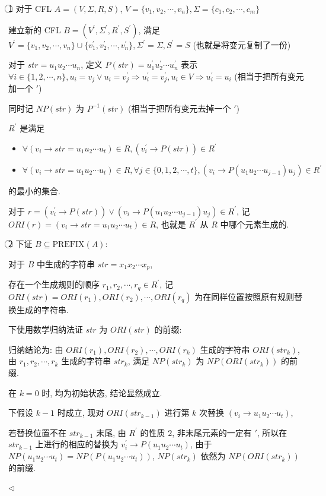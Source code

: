 \documentclass[11pt]{article}
\newenvironment{answer}[1][Answer]{\begin{trivlist}
		\item[\hskip \labelsep {\bfseries #1.}\hskip \labelsep]}{\hfill$\lhd$\end{trivlist}}
\begin{document}
	\begin{answer}
		\textcircled{1} 对于 CFL $A=(V,\Sigma,R,S)$, $V=\{v_1,v_2,\cdots,v_n\},\Sigma=\{c_1,c_2,\cdots,c_m\}$
		
		建立新的 CFL $B=(V^\prime,\Sigma^\prime,R^\prime,S^\prime)$, 满足 $V^\prime=\{v_1,v_2,\cdots,v_n\}\cup\{v_1^\prime,v_2^\prime,\cdots,v_n^\prime\},\Sigma^\prime=\Sigma,S^\prime=S$ (也就是将变元复制了一份)
		
		对于 $str=u_1u_2\cdots u_n$, 定义 $P(str)=u_1^\prime u_2^\prime\cdots u_n^\prime$ 表示 $\forall i\in\{1,2,\cdots,n\}, u_i=v_j\vee u_i=v_j^\prime\Rightarrow u_i^\prime=v_j^\prime,u_i\in V\Rightarrow u_i^\prime=u_i$ (相当于把所有变元加一个 $\prime$)
		
		同时记 $NP(str)$ 为 $P^{-1}(str)$ (相当于把所有变元去掉一个 $\prime$)
		
		$R^\prime$ 是满足 \begin{itemize}
			\item $\forall (v_i\rightarrow str=u_1u_2\cdots u_t)\in R, (v_i^\prime\rightarrow P(str))\in R^\prime$
			
			\item $\forall (v_i\rightarrow str=u_1u_2\cdots u_t)\in R,\forall j\in\{0,1,2,\cdots,t\}, (v_i\rightarrow P(u_1u_2\cdots u_{j-1})u_j)\in R^\prime$  
		\end{itemize}
		的最小的集合.
		
		对于 $r=(v_i^\prime\rightarrow P(str))\vee(v_i\rightarrow P(u_1u_2\cdots u_{j-1})u_j)\in R^\prime$, 记 $ORI(r)=(v_i\rightarrow str=u_1u_2\cdots u_t)\in R$, 也就是 $R^\prime$ 从 $R$ 中哪个元素生成的.
		
		\textcircled{2} 下证 $B\subseteq\text{PREFIX}(A)$:
		
		对于 $B$ 中生成的字符串 $str=x_1x_2\cdots x_p$,
		
		存在一个生成规则的顺序 $r_1,r_2,\cdots,r_q\in R^\prime$, 记 $ORI(str)=ORI(r_1),ORI(r_2),\cdots,ORI(r_q)$ 为在同样位置按照原有规则替换生成的字符串.
		
		下使用数学归纳法证 $str$ 为 $ORI(str)$ 的前缀:
		
		归纳结论为: 由 $ORI(r_1),ORI(r_2),\cdots,ORI(r_k)$ 生成的字符串 $ORI(str_k)$, 由 $r_1,r_2,\cdots,r_k$ 生成的字符串 $str_k$, 满足 $NP(str_k)$ 为 $NP(ORI(str_k))$ 的前缀.
		
		在 $k=0$ 时, 均为初始状态, 结论显然成立.
		
		下假设 $k-1$ 时成立, 现对 $ORI(str_{k-1})$ 进行第 $k$ 次替换 $(v_i\rightarrow u_1u_2\cdots u_t)$, 
		
		若替换位置不在 $str_{k-1}$ 末尾, 由 $R^\prime$ 的性质 $2$, 非末尾元素的一定有 $\prime$, 所以在 $str_{k-1}$ 上进行的相应的替换为 $v_i^\prime\rightarrow P(u_1u_2\cdots u_t)$, 由于 $NP(u_1u_2\cdots u_t)=NP(P(u_1u_2\cdots u_t))$, $NP(str_k)$ 依然为 $NP(ORI(str_k))$ 的前缀.
		

\end{answer}
\end{document}

